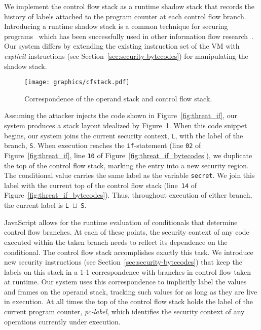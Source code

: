 \documentclass[preprint]{sigplanconf}
\begin{document}
We implement the control flow stack as a runtime shadow stack that records the history of labels attached to the program counter at each control flow branch.
Introducing a runtime shadow stack is a common technique for securing programs~\cite{abadi2009control, frantzen2001stackghost, prasad2003binary} which has been successfully used in other information flow research~\cite{lam2006general}.
Our system differs by extending the existing instruction set of the VM with \emph{explicit} instructions (see Section~\ref{sec:security-bytecodes}) for manipulating the shadow stack.

\begin{figure}[ht]
  \centerline{\texttt{[image: graphics/cfstack.pdf]}}
  \caption{Correspondence of the operand stack and control flow stack.}
  \label{fig:cfstack}
\end{figure}

Assuming the attacker injects the code shown in Figure~\ref{fig:threat_if}, our system produces a stack layout idealized by Figure~\ref{fig:cfstack}.
When this code snippet begins, our system joins the current security context, \texttt{L}, with the label of the branch, \texttt{S}.
When execution reaches the \texttt{if}-statement (line \texttt{02} of Figure~\ref{fig:threat_if}, line \texttt{10} of Figure~\ref{fig:threat_if_bytecodes}), we duplicate the top of the control flow stack, marking the entry into a new security region.
The conditional value carries the same label as the variable \texttt{secret}.
We join this label with the current top of the control flow stack (line~\texttt{14} of Figure~\ref{fig:threat_if_bytecodes}).
Thus, throughout execution of either branch, the current label is \texttt{L}~$\sqcup$~\texttt{S}.

JavaScript allows for the runtime evaluation of conditionals that determine control flow branches.
At each of these points, the security context of any code executed within the taken branch needs to reflect its dependence on the conditional.
The control flow stack accomplishes exactly this task.
We introduce new security instructions (see Section~\ref{sec:security-bytecodes}) that keep the labels on this stack in a 1-1 correspondence with branches in control flow taken at runtime.
Our system uses this correspondence to implicitly label the values and frames on the operand stack, tracking such values for as long as they are live in execution.
At all times the top of the control flow stack holds the label of the current program counter, \textit{pc-label}, which identifies the security context of any operations currently under execution.
\end{document}
